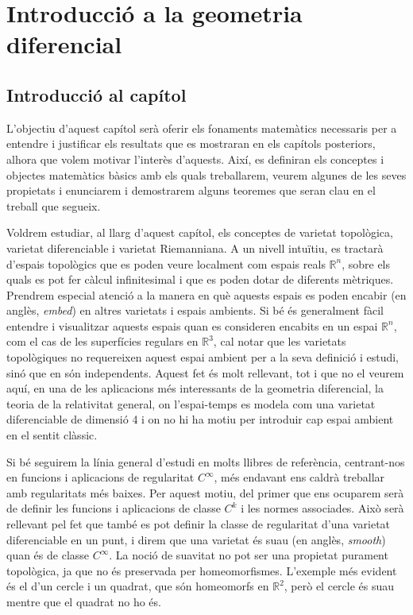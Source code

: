 \chapter{Introducció a la geometria diferencial}\label{cap:intro}



\section{Introducció al capítol}
L'objectiu d'aquest capítol serà oferir els fonaments matemàtics necessaris per a entendre i justificar els resultats que es mostraran en els capítols posteriors, alhora que volem motivar l'interès d'aquests. Així, es definiran els conceptes i objectes matemàtics bàsics amb els quals treballarem, veurem algunes de les seves propietats i enunciarem i demostrarem alguns teoremes que seran clau en el treball que segueix.

Voldrem estudiar, al llarg d'aquest capítol, els conceptes de varietat topològica, varietat diferenciable i varietat Riemanniana. A un nivell intuïtiu, es tractarà d'espais topològics que es poden veure localment com espais reals $\mathbb R^n$, sobre els quals es pot fer càlcul infinitesimal i que es poden dotar de diferents mètriques. Prendrem especial atenció a la manera en què aquests espais es poden encabir (en anglès, \textit{embed}) en altres varietats i espais ambients. Si bé és generalment fàcil entendre i visualitzar aquests espais quan es consideren encabits en un espai $\mathbb R^n$, com el cas de les superfícies regulars en $\mathbb R^3$, cal notar que les varietats topològiques no requereixen aquest espai ambient per a la seva definició i estudi, sinó que en són independents. Aquest fet és molt rellevant, tot i que no el veurem aquí, en una de les aplicacions més interessants de la geometria diferencial, la teoria de la relativitat general, on l'espai-temps es modela com una varietat diferenciable de dimensió 4 i on no hi ha motiu per introduir cap espai ambient en el sentit clàssic.

Si bé seguirem la línia general d'estudi en molts llibres de referència, centrant-nos en funcions i aplicacions de regularitat $C^\infty$, més endavant ens caldrà treballar amb regularitats més baixes. Per aquest motiu, del primer que ens ocuparem serà de definir les funcions i aplicacions de classe $C^k$ i les normes associades. Això serà rellevant pel fet que també es pot definir la classe de regularitat d'una varietat diferenciable en un punt, i direm que una varietat és suau (en anglès, \textit{smooth}) quan és de classe $C^\infty$. La noció de suavitat no pot ser una propietat purament topològica, ja que no és preservada per homeomorfismes. L'exemple més evident és el d'un cercle i un quadrat, que són homeomorfs en $\mathbb R^2$, però el cercle és suau mentre que el quadrat no ho és. 

